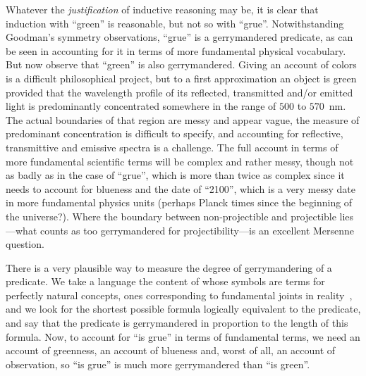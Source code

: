 Whatever the \textit{justification} of inductive reasoning may be, it is clear that induction with ``green'' is reasonable, but not so with
``grue''. Notwithstanding Goodman's symmetry observations, ``grue'' is a gerrymandered predicate, as can be seen in
accounting for it in terms of more fundamental physical vocabulary. But now observe that ``green'' is also gerrymandered. 
Giving an account of colors is a difficult philosophical project, but to a first approximation an object is green provided that the wavelength profile of its reflected, transmitted and/or emitted light is predominantly 
concentrated somewhere in the range of $500$ to $570$~nm. The actual boundaries of that region are messy and appear vague, the measure of
predominant concentration is difficult to specify, and accounting for reflective, transmittive and emissive spectra
is a challenge. The full account in terms of more fundamental scientific terms will be complex and rather messy, though 
not as badly as in the case of ``grue'', which is more than twice as complex since it needs to account for blueness
and the date of ``2100'', which is a very messy date in more fundamental physics units (perhaps 
Planck times since the beginning of the universe?). Where the boundary between non-projectible and projectible lies---what
counts as too gerrymandered for projectibility---is an excellent Mersenne question.

There is a very plausible way to measure the degree of gerrymandering of a predicate. We take a language the content of 
whose symbols are terms for perfectly natural concepts, ones corresponding to fundamental joints in reality~\parencite{LewisNewWork},
and we look for the shortest possible formula logically equivalent to the predicate, and say that the predicate is 
gerrymandered in proportion to the length of this formula. Now, to account for ``is grue'' in terms of fundamental
terms, we need an account of greenness, an account of blueness and, worst of all, an account of observation, so
``is grue'' is much more gerrymandered than ``is green''.

